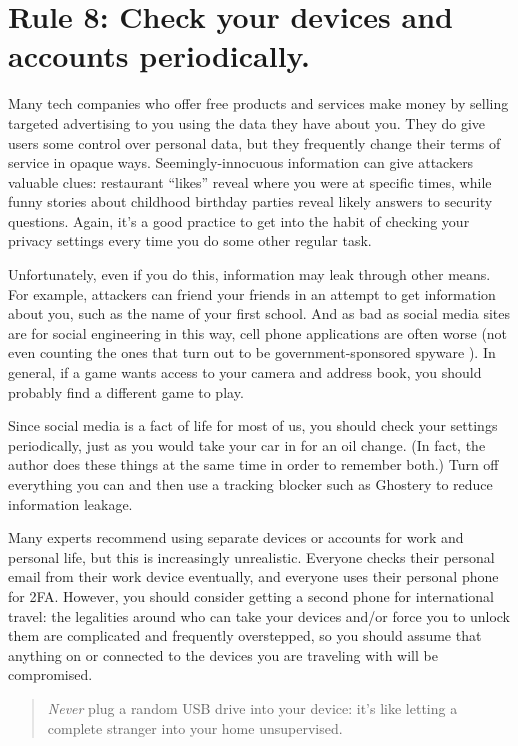 \documentclass[10pt,letterpaper]{article}
\begin{document}
\section*{Rule 8: Check your devices and accounts periodically.}

Many tech companies who offer free products and services make money by selling
targeted advertising to you using the data they have about you.  They do give
users some control over personal data, but they frequently change their terms of
service in opaque ways. Seemingly-innocuous information can give attackers
valuable clues: restaurant ``likes'' reveal where you were at specific times,
while funny stories about childhood birthday parties reveal likely answers to
security questions. Again, it's a good practice to get into the habit of
checking your privacy settings every time you do some other regular task.

Unfortunately, even if you do this, information may leak through other
means. For example, attackers can friend your friends in an attempt to get
information about you, such as the name of your first school. And as bad as
social media sites are for social engineering in this way, cell phone
applications are often worse (not even counting the ones that turn out to be
government-sponsored spyware \cite{Schn2019}). In general, if a game wants
access to your camera and address book, you should probably find a different
game to play.

Since social media is a fact of life for most of us, you should check your
settings periodically, just as you would take your car in for an oil change. (In
fact, the author does these things at the same time in order to remember both.)
Turn off everything you can and then use a tracking blocker such as Ghostery to
reduce information leakage.

Many experts recommend using separate devices or accounts for work and personal
life, but this is increasingly unrealistic. Everyone checks their personal email
from their work device eventually, and everyone uses their personal phone for
2FA. However, you should consider getting a second phone for international
travel: the legalities around who can take your devices and/or force you to
unlock them are complicated and frequently overstepped, so you should assume
that anything on or connected to the devices you are traveling with will be
compromised.

\begin{quote}
  \emph{Never} plug a random USB drive into your device: it's like letting a
  complete stranger into your home unsupervised.
\end{quote}
\end{document}
